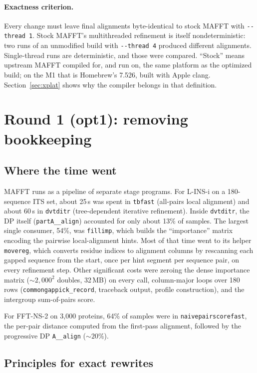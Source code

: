 \documentclass[11pt]{article}
\newcommand{\code}[1]{\texttt{#1}}
\begin{document}
\paragraph{Exactness criterion.} Every change must leave final alignments byte-identical to
stock MAFFT with \code{-{}-thread 1}. Stock MAFFT's multithreaded refinement is itself
nondeterministic: two runs of an unmodified build with \code{-{}-thread 4} produced different
alignments. Single-thread runs are deterministic, and those were compared. ``Stock'' means
upstream MAFFT compiled for, and run on, the same platform as the optimized build; on the M1
that is Homebrew's 7.526, built with Apple clang. Section~\ref{sec:xplat} shows why the
compiler belongs in that definition.

\section{Round 1 (opt1): removing bookkeeping}
\label{sec:round1}

\subsection{Where the time went}

MAFFT runs as a pipeline of separate stage programs. For L-INS-i on a 180-sequence ITS set,
about 25\,s was spent in \code{tbfast} (all-pairs local alignment) and about 60\,s in
\code{dvtditr} (tree-dependent iterative refinement). Inside \code{dvtditr}, the DP itself
(\code{partA\_\_align}) accounted for only about 13\% of samples. The largest single
consumer, 54\%, was \code{fillimp}, which builds the ``importance'' matrix encoding the
pairwise local-alignment hints. Most of that time went to its helper \code{movereg}, which
converts residue indices to alignment columns by rescanning each gapped sequence from the
start, once per hint segment per sequence pair, on every refinement step. Other significant
costs were zeroing the dense importance matrix (${\sim}2{,}000^2$ doubles, 32\,MB) on every
call, column-major loops over 180 rows (\code{commongappick\_record}, traceback output,
profile construction), and the intergroup sum-of-pairs score.

For FFT-NS-2 on 3{,}000 proteins, 64\% of samples were in \code{naivepairscorefast}, the
per-pair distance computed from the first-pass alignment, followed by the progressive DP
\code{A\_\_align} (${\sim}20\%$).

\subsection{Principles for exact rewrites}
\label{sec:principles}
\end{document}
